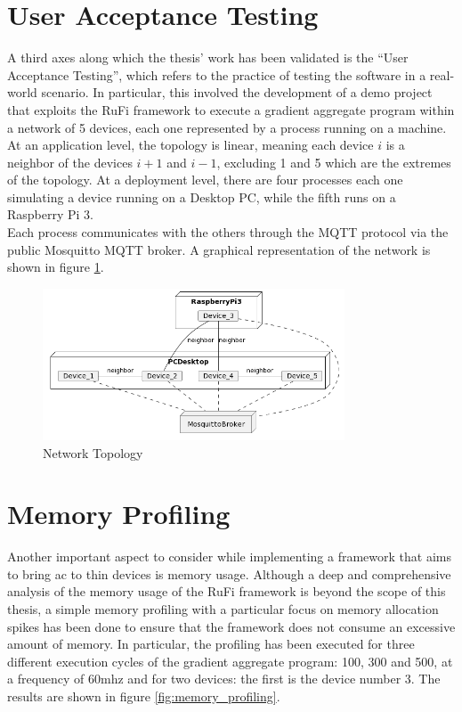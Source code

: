 

\section{User Acceptance Testing}
A third axes along which the thesis' work has been validated is the ``User Acceptance Testing'', which refers to the practice of testing the software in a real-world scenario.
In particular, this involved the development of a demo project that exploits the RuFi framework to execute a gradient aggregate program within a network of 5 devices, each one
represented by a process running on a machine. At an application level, the topology is linear, meaning each device $i$ is a neighbor of the devices $i+1$ and $i-1$, excluding 1 and 5
which are the extremes of the topology. At a deployment level, there are four processes each one simulating a device running on a Desktop PC, while the fifth runs on a Raspberry Pi 3.\\
Each process communicates with the others through the MQTT protocol via the public Mosquitto MQTT broker. A graphical representation of the network is shown in figure \ref{fig:network_topology}.

\begin{figure}[ht!]
    \centering
    \includegraphics[width=0.8\textwidth]{figures/diagrams/img/deployment-demo.png}
    \caption{Network Topology}
    \label{fig:network_topology}
\end{figure}

\section{Memory Profiling}
Another important aspect to consider while implementing a framework that aims to bring \ac{ac} to thin devices is memory usage. Although a deep and comprehensive analysis of
the memory usage of the RuFi framework is beyond the scope of this thesis, a simple memory profiling with a particular focus on memory allocation spikes has been done to ensure that the framework does not consume an excessive amount of memory.
In particular, the profiling has been executed for three different execution cycles of the gradient aggregate program: 100, 300 and 500, at a frequency of 60mhz and for two devices:
the first is the device number 3. The results are shown in figure \ref{fig:memory_profiling}.
